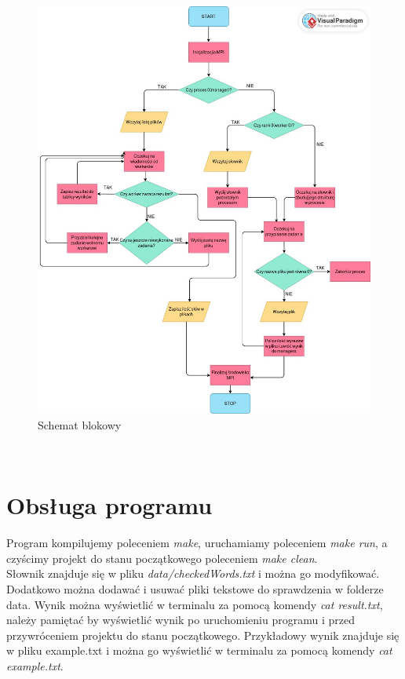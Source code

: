 \documentclass{article}
\begin{document}
\begin{figure}[!htb]
  \centering
  \includegraphics[width=\textwidth]{diagram.jpg}
  \caption{Schemat blokowy}
  \label{fig:diagram}
\end{figure}
\

\section{Obsługa programu}
Program kompilujemy poleceniem \textit{make}, uruchamiamy poleceniem \textit{make run}, a czyścimy projekt do stanu początkowego poleceniem \textit{make clean}.\\
Słownik znajduje się w pliku \textit{data/checkedWords.txt} i można go modyfikować. Dodatkowo można dodawać i usuwać pliki tekstowe do sprawdzenia w folderze data.
Wynik można wyświetlić w terminalu za pomocą komendy \textit{cat result.txt}, należy pamiętać by wyświetlić wynik po uruchomieniu programu i przed przywróceniem projektu do stanu początkowego.
Przykładowy wynik znajduje się w pliku example.txt i można go wyświetlić w terminalu za pomocą komendy \textit{cat example.txt}.
\end{document}
